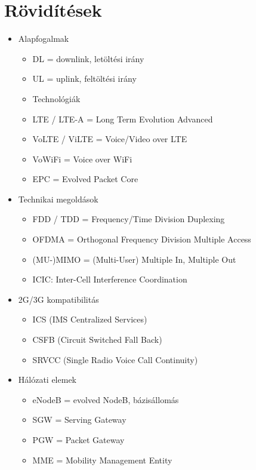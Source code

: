 \documentclass[10pt,a4paper]{article}
\begin{document}
\section{Rövidítések}
\begin{multicols}{2}
	\begin{minipage}{0.45\textwidth}
	\begin{itemize}
		\item Alapfogalmak
	\begin{itemize}
		\item DL = downlink, letöltési irány
		\item UL = uplink, feltöltési irány
		\item Technológiák
		\item LTE / LTE-A = Long Term Evolution Advanced
		\item VoLTE / ViLTE = Voice/Video over LTE
		\item VoWiFi = Voice over WiFi
		\item EPC = Evolved Packet Core
	\end{itemize}
	\item Technikai megoldások
	\begin{itemize}
		\item FDD / TDD = Frequency/Time Division Duplexing
		\item OFDMA = Orthogonal Frequency Division Multiple Access
		\item (MU-)MIMO = (Multi-User) Multiple In, Multiple Out
		\item ICIC: Inter-Cell Interference Coordination
	\end{itemize}
		\item 2G/3G kompatibilitás
		\begin{itemize}
		\item ICS (IMS Centralized Services)
		\item CSFB (Circuit Switched Fall Back)
		\item SRVCC (Single Radio Voice Call Continuity)
		\end{itemize}
	\end{itemize}
	\end{minipage}
\begin{itemize}
	\item Hálózati elemek
\begin{itemize}
	\item eNodeB = evolved NodeB, bázisállomás
\item SGW = Serving Gateway
\item PGW = Packet Gateway
\item MME = Mobility Management Entity

\end{itemize}
\end{itemize}
\end{multicols}
\end{document}
